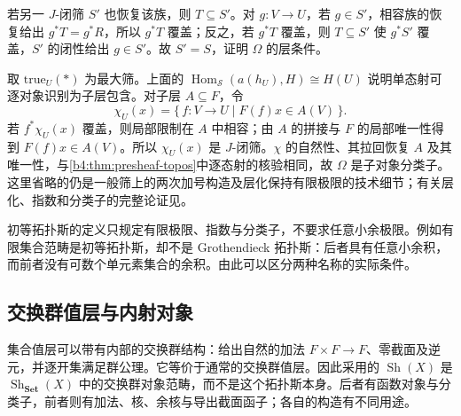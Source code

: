 \begin{proofsketch}
	若另一 \(J\)-闭筛 \(S'\) 也恢复该族，则 \(T\subseteq S'\)。对 \(g:V\to U\)，若 \(g\in S'\)，相容族的恢复给出 \(g^*T=g^*R\)，所以 \(g^*T\) 覆盖；反之，若 \(g^*T\) 覆盖，则 \(T\subseteq S'\) 使 \(g^*S'\) 覆盖，\(S'\) 的闭性给出 \(g\in S'\)。故 \(S'=S\)，证明 \(\Omega\) 的层条件。

	取 \(\mathrm{true}_U(*)\) 为最大筛。上面的 \(\operatorname{Hom}_{\mathcal S}(a(h_U),H)\cong H(U)\) 说明单态射可逐对象识别为子层包含。对子层 \(A\subseteq F\)，令
	\[
		\chi_U(x)=\{\,f:V\to U\mid F(f)x\in A(V)\,\}.
	\]
	若 \(f^*\chi_U(x)\) 覆盖，则局部限制在 \(A\) 中相容；由 \(A\) 的拼接与 \(F\) 的局部唯一性得到 \(F(f)x\in A(V)\)。所以 \(\chi_U(x)\) 是 \(J\)-闭筛。\(\chi\) 的自然性、其拉回恢复 \(A\) 及其唯一性，与\cref{b4:thm:presheaf-topos}中逐态射的核验相同，故 \(\Omega\) 是子对象分类子。这里省略的仍是一般筛上的两次加号构造及层化保持有限极限的技术细节；有关层化、指数和分类子的完整论证见\cite[Chapter III, Sections 4--7; Chapter IV, Section 2]{MacLaneMoerdijk1992Sheaves}。
\end{proofsketch}

初等拓扑斯的定义只规定有限极限、指数与分类子，不要求任意小余极限。例如有限集合范畴是初等拓扑斯，却不是 Grothendieck 拓扑斯：后者具有任意小余积，而前者没有可数个单元素集合的余积。由此可以区分两种名称的实际条件。

\subsection{交换群值层与内射对象}
\label{b4:subsec:E03:03}

集合值层可以带有内部的交换群结构：给出自然的加法 \(F\times F\to F\)、零截面及逆元，并逐开集满足群公理。它等价于通常的交换群值层。因此采用的 \(\operatorname{Sh}(X)\) 是 \(\operatorname{Sh}_{\mathbf{Set}}(X)\) 中的交换群对象范畴，而不是这个拓扑斯本身。后者有函数对象与分类子，前者则有加法、核、余核与导出截面函子；各自的构造有不同用途。

